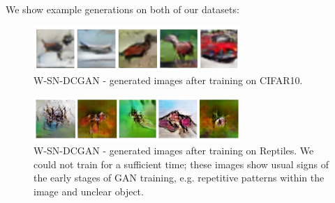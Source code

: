 We show example generations on both of our datasets:
\begin{figure}[H]
\centering
\includegraphics[width=0.7\textwidth]{../code/results/figures/images/w-sn-dcgan_cifar10}
\caption{W-SN-DCGAN - generated images after training on CIFAR10.}
\end{figure}

\begin{figure}[H]
\centering
\includegraphics[width=0.7\textwidth]{../code/results/figures/images/w-sn-dcgan_reptiles}
\caption{W-SN-DCGAN - generated images after training on Reptiles. We could not train for a sufficient time; these images show usual signs of the early stages of GAN training, e.g. repetitive patterns within the image and unclear object.}
\end{figure}
